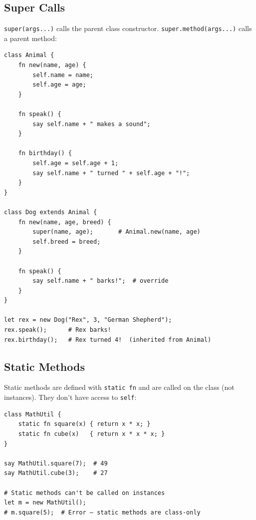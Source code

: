 \subsection{Super Calls}

\texttt{super(args...)} calls the parent class constructor. \texttt{super.method(args...)} calls a parent method:

\begin{tcolorbox}[colback=codebg, colframe=darkpurple, colbacktitle=darkpurple, title=\textbf{\textcolor{codegold}{Super Calls}}, fonttitle=\bfseries, sharp corners]
\begin{lstlisting}
class Animal {
    fn new(name, age) {
        self.name = name;
        self.age = age;
    }

    fn speak() {
        say self.name + " makes a sound";
    }

    fn birthday() {
        self.age = self.age + 1;
        say self.name + " turned " + self.age + "!";
    }
}

class Dog extends Animal {
    fn new(name, age, breed) {
        super(name, age);       # Animal.new(name, age)
        self.breed = breed;
    }

    fn speak() {
        say self.name + " barks!";  # override
    }
}

let rex = new Dog("Rex", 3, "German Shepherd");
rex.speak();      # Rex barks!
rex.birthday();   # Rex turned 4!  (inherited from Animal)
\end{lstlisting}
\end{tcolorbox}

\subsection{Static Methods}

Static methods are defined with \texttt{static fn} and are called on the class (not instances). They don't have access to \texttt{self}:

\begin{tcolorbox}[colback=codebg, colframe=darkpurple, colbacktitle=darkpurple, title=\textbf{\textcolor{codegold}{Static Methods}}, fonttitle=\bfseries, sharp corners]
\begin{lstlisting}
class MathUtil {
    static fn square(x) { return x * x; }
    static fn cube(x)   { return x * x * x; }
}

say MathUtil.square(7);  # 49
say MathUtil.cube(3);    # 27

# Static methods can't be called on instances
let m = new MathUtil();
# m.square(5);  # Error — static methods are class-only
\end{lstlisting}
\end{tcolorbox}

